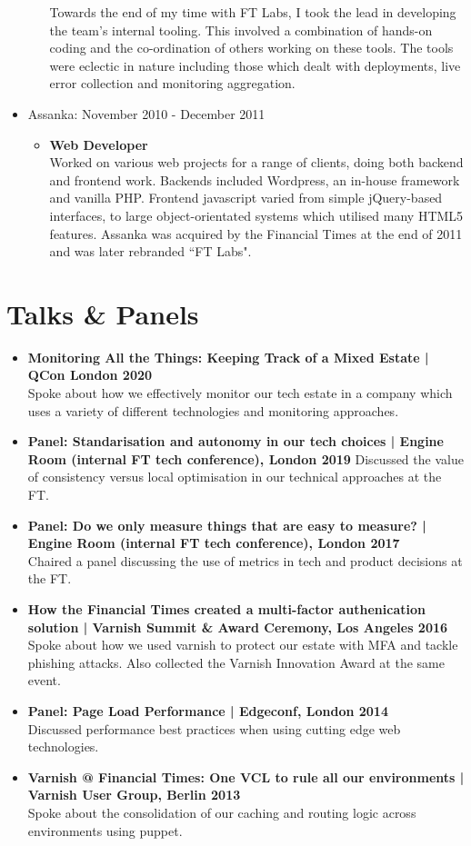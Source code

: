 \documentclass[a4paper]{article}
\begin{document}
\begin{itemize}
\begin{itemize}
Towards the end of my time with FT Labs, I took the lead in developing the team's internal tooling.  This involved a combination of hands-on coding and the co-ordination of others working on these tools.  The tools were eclectic in nature including those which dealt with deployments, live error collection and monitoring aggregation.
\end{itemize}

\item Assanka: November 2010 - December 2011
\begin{itemize}
\item {\bf Web Developer}\\
Worked on various web projects for a range of clients, doing both backend and frontend work. Backends included Wordpress, an in-house framework and vanilla PHP. Frontend javascript varied from simple jQuery-based interfaces, to large object-orientated systems which utilised many HTML5 features.
Assanka was acquired by the Financial Times at the end of 2011 and was later rebranded ``FT Labs".
\end{itemize}

\end{itemize}

\section*{Talks \& Panels}
\begin{itemize}

\item{\bf Monitoring All the Things: Keeping Track of a Mixed Estate | QCon London 2020}\\
Spoke about how we effectively monitor our tech estate in a company which uses a variety of different technologies and monitoring approaches.
\item{\bf Panel: Standarisation and autonomy in our tech choices | Engine Room (internal FT tech conference), London 2019}
Discussed the value of consistency versus local optimisation in our technical approaches at the FT.
\item{\bf Panel: Do we only measure things that are easy to measure? | Engine Room (internal FT tech conference), London 2017}\\
Chaired a panel discussing the use of metrics in tech and product decisions at the FT.
\item{\bf How the Financial Times created a multi-factor authenication solution | Varnish Summit \& Award Ceremony, Los Angeles 2016}
Spoke about how we used varnish to protect our estate with MFA and tackle phishing attacks.  Also collected the Varnish Innovation Award at the same event.
\item{\bf Panel: Page Load Performance | Edgeconf, London 2014 }\\
Discussed performance best practices when using cutting edge web technologies.
\item{\bf Varnish @ Financial Times: One VCL to rule all our environments | Varnish User Group, Berlin 2013}\\
Spoke about the consolidation of our caching and routing logic across environments using puppet.
\end{itemize}
\end{document}
